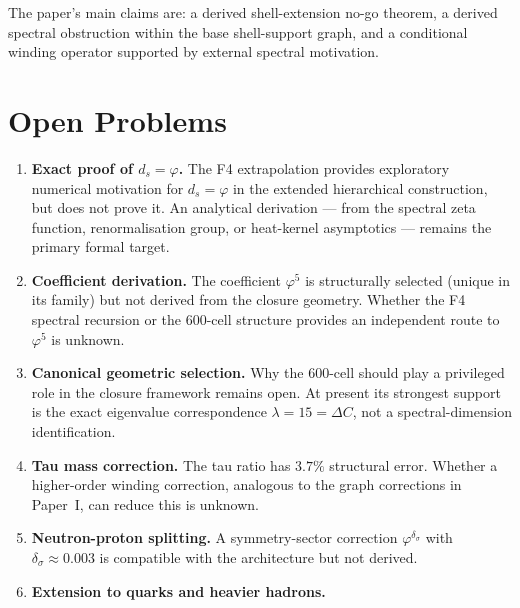 \documentclass[12pt]{article}
\newcommand{\phig}{\varphi}
\newcommand{\ds}{d_s}
\begin{document}
The paper's main claims are: a derived shell-extension no-go theorem, a derived spectral obstruction within the base shell-support graph, and a conditional winding operator supported by external spectral motivation.

\section{Open Problems}\label{sec:open}

\begin{enumerate}
    \item \textbf{Exact proof of $\ds = \phig$.} The F4 extrapolation provides exploratory numerical motivation for $\ds = \phig$ in the extended hierarchical construction, but does not prove it. An analytical derivation --- from the spectral zeta function, renormalisation group, or heat-kernel asymptotics --- remains the primary formal target.

    \item \textbf{Coefficient derivation.} The coefficient $\phig^5$ is structurally selected (unique in its family) but not derived from the closure geometry. Whether the F4 spectral recursion or the 600-cell structure provides an independent route to $\phig^5$ is unknown.

    \item \textbf{Canonical geometric selection.} Why the 600-cell should play a privileged role in the closure framework remains open. At present its strongest support is the exact eigenvalue correspondence $\lambda = 15 = \Delta C$, not a spectral-dimension identification.

    \item \textbf{Tau mass correction.} The tau ratio has $3.7\%$ structural error. Whether a higher-order winding correction, analogous to the graph corrections in Paper~I, can reduce this is unknown.

    \item \textbf{Neutron-proton splitting.} A symmetry-sector correction $\phig^{\delta_\sigma}$ with $\delta_\sigma \approx 0.003$ is compatible with the architecture but not derived.

    \item \textbf{Extension to quarks and heavier hadrons.}
\end{enumerate}

\end{document}
